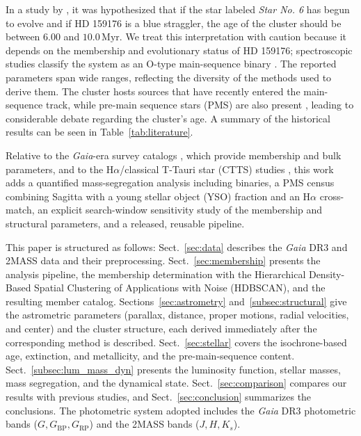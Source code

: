 \documentclass{aa}
\begin{document}
In a study by \citet{2018AA...610A..30A}, it was hypothesized that if the star labeled \textit{Star No. 6} has begun to evolve and if HD 159176 is a blue straggler, the age of the cluster should be between $6.00$ and $10.0\,\mathrm{Myr}$. We treat this interpretation with caution because it depends on the membership and evolutionary status of HD 159176; spectroscopic studies classify the system as an O-type main-sequence binary \citep{1993Obs...113..204S,2007A&A...474..193L,2016ApJ...832..211P}. The reported parameters span wide ranges, reflecting the diversity of the methods used to derive them. The cluster hosts sources that have recently entered the main-sequence track, while pre-main sequence stars (PMS) are also present \citep{2019MNRAS.484.5102K}, leading to considerable debate regarding the cluster's age. A summary of the historical results can be seen in Table~\ref{tab:literature}.

Relative to the \textit{Gaia}-era survey catalogs \citep{2020AA...640A...1C,2022ApJS..262....7H,2024arXiv240305143H}, which provide membership and bulk parameters, and to the H$\alpha$/classical T-Tauri star (CTTS) studies \citep{2010AA...511A..25R,2019MNRAS.484.5102K}, this work adds a quantified mass-segregation analysis including binaries, a PMS census combining Sagitta with a young stellar object (YSO) fraction and an H$\alpha$ cross-match, an explicit search-window sensitivity study of the membership and structural parameters, and a released, reusable pipeline.

This paper is structured as follows: Sect.~\ref{sec:data} describes the \textit{Gaia} DR3 and 2MASS data and their preprocessing. Sect.~\ref{sec:membership} presents the analysis pipeline, the membership determination with the Hierarchical Density-Based Spatial Clustering of Applications with Noise (HDBSCAN), and the resulting member catalog. Sections~\ref{sec:astrometry} and~\ref{subsec:structural} give the astrometric parameters (parallax, distance, proper motions, radial velocities, and center) and the cluster structure, each derived immediately after the corresponding method is described. Sect.~\ref{sec:stellar} covers the isochrone-based age, extinction, and metallicity, and the pre-main-sequence content. Sect.~\ref{subsec:lum_mass_dyn} presents the luminosity function, stellar masses, mass segregation, and the dynamical state. Sect.~\ref{sec:comparison} compares our results with previous studies, and Sect.~\ref{sec:conclusion} summarizes the conclusions. The photometric system adopted includes the \textit{Gaia} DR3 photometric bands ($G, G_{\text{BP}}, G_{\text{RP}}$) and the 2MASS bands ($J, H, K_s$).
\end{document}

